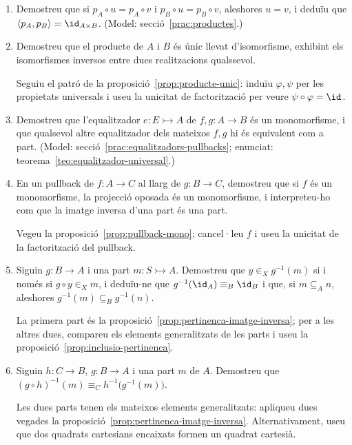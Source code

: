 \begin{enumerate}[resume]
  \item Demostreu que si \(p_A\circ u=p_A\circ v\) i \(p_B\circ u=p_B\circ v\), aleshores \(u=v\), i deduïu que \(\langle p_A,p_B\rangle=\id_{A\times B}\). (Model: secció~\ref{prac:productes}.)

  \item Demostreu que el producte de \(A\) i \(B\) és únic llevat d'isomorfisme, exhibint els isomorfismes inversos entre dues realitzacions qualssevol. \begin{indicacio}Seguiu el patró de la proposició~\ref{prop:producte-unic}: induïu \(\varphi,\psi\) per les propietats universals i useu la unicitat de factorització per veure \(\psi\circ\varphi=\id\).\end{indicacio}

  \item Demostreu que l'equalitzador \(e:E\rightarrowtail A\) de \(f,g:A\to B\) és un monomorfisme, i que qualsevol altre equalitzador dels mateixos \(f,g\) hi és equivalent com a part. (Model: secció~\ref{prac:equalitzadors-pullbacks}; enunciat: teorema~\ref{teo:equalitzador-universal}.)

  \item En un pullback de \(f:A\to C\) al llarg de \(g:B\to C\), demostreu que si \(f\) és un monomorfisme, la projecció oposada és un monomorfisme, i interpreteu-ho com que la imatge inversa d'una part és una part. \begin{indicacio}Vegeu la proposició~\ref{prop:pullback-mono}; cancel·leu \(f\) i useu la unicitat de la factorització del pullback.\end{indicacio}

  \item Siguin \(g:B\to A\) i una part \(m:S\rightarrowtail A\). Demostreu que \(y\in_X g^{-1}(m)\) si i només si \(g\circ y\in_X m\), i deduïu-ne que \(g^{-1}(\id_A)\equiv_B\id_B\) i que, si \(m\subseteq_A n\), aleshores \(g^{-1}(m)\subseteq_B g^{-1}(n)\). \begin{indicacio}La primera part és la proposició~\ref{prop:pertinenca-imatge-inversa}; per a les altres dues, compareu els elements generalitzats de les parts i useu la proposició~\ref{prop:inclusio-pertinenca}.\end{indicacio}

  \item Siguin \(h\colon C\to B\), \(g\colon B\to A\) i una part \(m\) de \(A\). Demostreu que \((g\circ h)^{-1}(m)\equiv_C h^{-1}\bigl(g^{-1}(m)\bigr)\). \begin{indicacio}Les dues parts tenen els mateixos elements generalitzats: apliqueu dues vegades la proposició~\ref{prop:pertinenca-imatge-inversa}. Alternativament, useu que dos quadrats cartesians encaixats formen un quadrat cartesià.\end{indicacio}


\end{enumerate}

